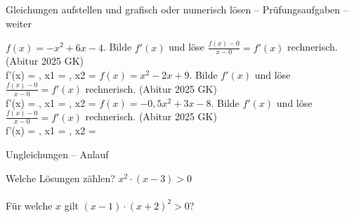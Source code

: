 \begin{aufgabe}{Gleichungen aufstellen und grafisch oder numerisch lösen – Prüfungsaufgaben – weiter}
\begin{teile}
\teil $f(x) = -x^2 + 6x - 4$. Bilde $f'(x)$ und löse $\frac{f(x) - 0}{x - 0} = f'(x)$ rechnerisch. \hfill (Abitur 2025 GK) \\ f'(x) = \leerfeld , x1 = \leerfeld , x2 = \leerfeld
\teil $f(x) = x^2 - 2x + 9$. Bilde $f'(x)$ und löse $\frac{f(x) - 0}{x - 0} = f'(x)$ rechnerisch. \hfill (Abitur 2025 GK) \\ f'(x) = \leerfeld , x1 = \leerfeld , x2 = \leerfeld
\teil $f(x) = -0{,}5x^2 + 3x - 8$. Bilde $f'(x)$ und löse $\frac{f(x) - 0}{x - 0} = f'(x)$ rechnerisch. \hfill (Abitur 2025 GK) \\ f'(x) = \leerfeld , x1 = \leerfeld , x2 = \leerfeld
\end{teile}
\end{aufgabe}

\begin{aufgabe}{Ungleichungen – Anlauf}
\begin{teile}
\teil Welche Lösungen zählen? $x^2 \cdot (x - 3) > 0$  \\  \\ 
\teil Für welche $x$ gilt $(x - 1) \cdot (x + 2)^2 > 0$? \leerfeld
\end{teile}
\end{aufgabe}


